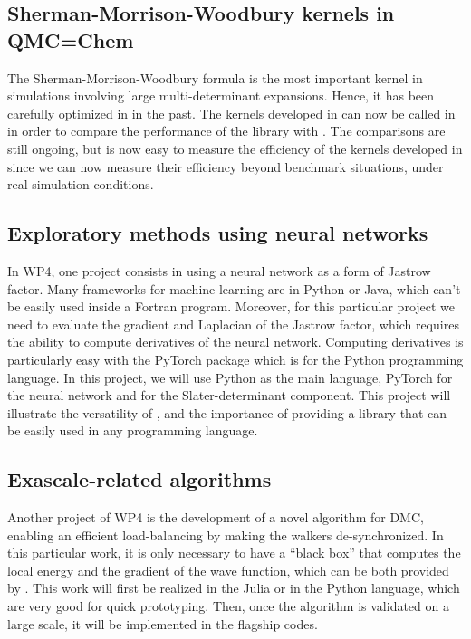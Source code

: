 \subsection{Sherman-Morrison-Woodbury kernels in QMC=Chem}

The Sherman-Morrison-Woodbury formula is the most important kernel in
simulations involving large multi-determinant expansions. Hence, it has
been carefully optimized in \qmcchem{} in the past. The kernels
developed in \QMCkl{} can now be called in \qmcchem{} in order
to compare the performance of the library with \qmcchem{}. The
comparisons are still ongoing, but is now easy to measure the
efficiency of the kernels developed in \QMCkl{} since we can now
measure their efficiency beyond benchmark situations, under real
simulation conditions.

\subsection{Exploratory methods using neural networks}

In \ac{WP}4, one project consists in using a neural network as a
form of Jastrow factor. Many frameworks for machine learning are in
Python or Java, which can't be easily used inside a Fortran program.
Moreover, for this particular project we need to evaluate the gradient
and Laplacian of the Jastrow factor, which requires the ability to
compute derivatives of the neural network. Computing derivatives is
particularly easy with the PyTorch package which is for the Python
programming language. In this project, we will use Python as the main
language, PyTorch for the neural network and \QMCkl{} for the
Slater-determinant component. This project will illustrate the
versatility of \QMCkl{}, and the importance of providing a library that
can be easily used in any programming language.


\subsection{Exascale-related algorithms}

Another project of \ac{WP}4 is the development of a novel algorithm
for \ac{DMC}, enabling an efficient load-balancing by
making the walkers de-synchronized. In this particular work, it is only
necessary to have a ``black box'' that computes the local energy and
the gradient of the wave function, which can be both provided by \QMCkl{}.
This work will first be realized in the Julia or in the Python
language, which are very good for quick prototyping. Then, once the
algorithm is validated on a large scale, it will be implemented in the
flagship codes.


